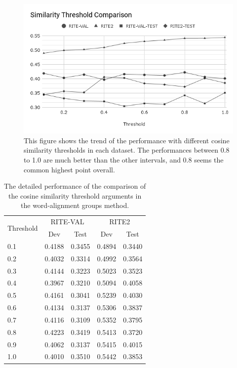 \documentclass[12pt]{article}
\begin{document}
\begin{CJK*}{UTF8}{bkai}
\begin{spacing}{1.77}
\begin{figure}[H]
  \centering
  \includegraphics[width=15cm]{SimThresholdComp.png}
  \caption[Cosine Similarity Threshold Comparison]{This figure shows the trend of the performance with different cosine similarity thresholds in each dataset. The performances between 0.8 to 1.0 are much better than the other intervals, and 0.8 seems the common highest point overall.}
  \label{fig:threshold}
\end{figure}

\begin{table}[H]
  \centering
  \setlength{\extrarowheight}{-3pt}
  \caption{The detailed performance of the comparison of the cosine similarity threshold arguments in the word-alignment groups method.}
  \label{result:threshold_comparison}
  \begin{tabular}{|l|l|l|l|l|}
  \hline
  \multirow{2}{*}{Threshold} & \multicolumn{2}{c|}{RITE-VAL} & \multicolumn{2}{c|}{RITE2} \\ \cline{2-5}
   & \multicolumn{1}{c|}{Dev} & \multicolumn{1}{c|}{Test} & \multicolumn{1}{c|}{Dev} & \multicolumn{1}{c|}{Test} \\ \hline
  0.1 & 0.4188 & 0.3455 & 0.4894 & 0.3440 \\ \hline
  0.2 & 0.4032 & 0.3314 & 0.4992 & 0.3564 \\ \hline
  0.3 & 0.4144 & 0.3223 & 0.5023 & 0.3523 \\ \hline
  0.4 & 0.3967 & 0.3210 & 0.5094 & 0.4058 \\ \hline
  0.5 & 0.4161 & 0.3041 & 0.5239 & 0.4030 \\ \hline
  0.6 & 0.4134 & 0.3137 & 0.5306 & 0.3837 \\ \hline
  0.7 & 0.4116 & 0.3109 & 0.5352 & 0.3795 \\ \hline
  0.8 & 0.4223 & 0.3419 & 0.5413 & 0.3720 \\ \hline
  0.9 & 0.4062 & 0.3137 & 0.5415 & 0.4015 \\ \hline
  1.0 & 0.4010 & 0.3510 & 0.5442 & 0.3853 \\ \hline
  \end{tabular}
\end{table}


\end{spacing}
\end{CJK*}
\end{document}
